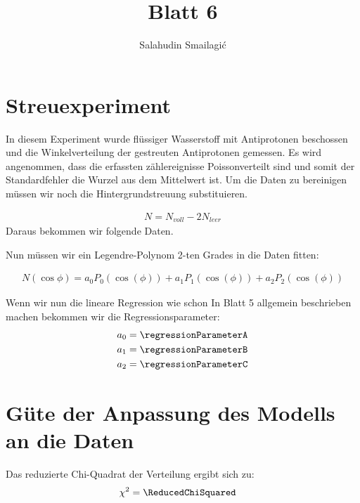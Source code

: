 \documentclass[11pt]{article}
\title{Blatt 6}
\author{Salahudin Smailagić}
\begin{document}
        \maketitle

        \section{Streuexperiment}
        In diesem Experiment wurde flüssiger Wasserstoff mit Antiprotonen beschossen und die Winkelverteilung der gestreuten Antiprotonen gemessen.
        Es wird angenommen, dass die erfassten zählereignisse Poissonverteilt sind und somit der Standardfehler die Wurzel aus dem Mittelwert ist.
        Um die Daten zu bereinigen müssen wir noch die Hintergrundstreuung substituieren. 
        
        \begin{align*}
            N = N_{voll} - 2 N_{leer}
        \end{align*}
        Daraus bekommen wir folgende Daten.

        
        Nun müssen wir ein Legendre-Polynom 2-ten Grades in die Daten fitten:
        
        \begin{align*}
            N(\cos{\phi}) = a_0 P_0 (\cos(\phi)) + a_1 P_1 (\cos(\phi)) + a_2 P_2 (\cos(\phi))
        \end{align*}

        Wenn wir nun die lineare Regression wie schon In Blatt 5 allgemein beschrieben machen bekommen wir die Regressionsparameter:
        \begin{align*}
            a_0 &= \regressionParameterA \\
            a_1 &= \regressionParameterB \\
            a_2 &= \regressionParameterC
        \end{align*}


        \section{Güte der Anpassung des Modells an die Daten}

        Das reduzierte Chi-Quadrat der Verteilung ergibt sich zu:
        \begin{align*}
            \chi^2 &= \ReducedChiSquared
        \end{align*}
\end{document}
